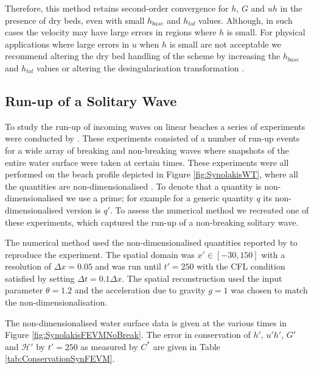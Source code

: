 \documentclass[times]{elsarticle}
\begin{document}
Therefore, this method retains second-order convergence for $h$, $G$ and $uh$ in the presence of dry beds, even with small $h_{{base}}$ and $h_{{tol}}$ values. Although, in such cases the velocity may have large errors in regions where $h$ is small. For physical applications where large errors in $u$ when $h$ is small are not acceptable we recommend altering the dry bed handling of the scheme by increasing the $h_{{base}}$ and $h_{{tol}}$ values or altering the desingularisation transformation \cite{Kurganov-Petrova-2007-707}. 


\subsection{Run-up of a Solitary Wave}

To study the run-up of incoming waves on linear beaches a series of experiments were conducted by \citet{Synolakis-1987-523}. These experiments consisted of a number of run-up events for a wide array of breaking and non-breaking waves where snapshots of the entire water surface were taken at certain times. These experiments were all performed on the beach profile depicted in Figure \ref{fig:SynolakisWT}, where all the quantities are non-dimensionalised \cite{Synolakis-1987-523}. To denote that a quantity is non-dimensionalised we use a prime; for example for a generic quantity $q$ its non-dimensionalised version is $q'$. To assess the numerical method we recreated one of these experiments, which captured the run-up of a non-breaking solitary wave.

The numerical method used the non-dimensionalised quantities reported by \citet{Synolakis-1987-523} to reproduce the experiment. The spatial domain was $x' \in [-30,150]$ with a resolution of $\Delta x = 0.05$ and was run until $t' = 250$ with the CFL condition \cite{Courant-etal-1967-215} satisfied by setting $\Delta t = 0.1 \Delta x$. The spatial reconstruction used the input parameter $\theta = 1.2$ and the acceleration due to gravity $g= 1$ was chosen to match the non-dimensionalisation.

The non-dimensionalised water surface data is given at the various times in Figure \ref{fig:SynolakisFEVMNoBreak}. The error in conservation of $h'$, $u'h'$, $G'$ and $\mathcal{H}'$ by $t' = 250$ as measured by $C^*$ are given in Table \ref{tab:ConservationSynFEVM}. 
\end{document}
